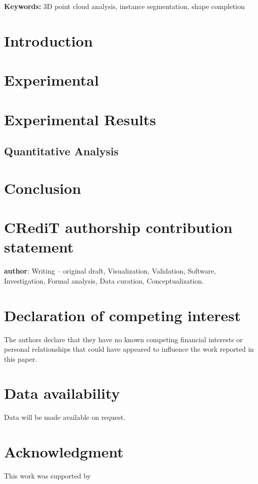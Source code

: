 \documentclass[12pt]{article}
\begin{document}
\textbf{Keywords:} 3D point cloud analysis, instance segmentation, shape completion

\doublespacing

\section{Introduction}

\citep{barbole_comparative_2023}


\section{Experimental}

\section{Experimental Results}

\subsection{Quantitative Analysis}

\section{Conclusion}


\section*{CRediT authorship contribution statement}
\textbf{author}: Writing – original draft, Visualization, Validation, Software, Investigation, Formal analysis, Data curation, Conceptualization. 

\section*{Declaration of competing interest}
The authors declare that they have no known competing financial interests or personal relationships that could have appeared to influence the work reported in this paper.

\section*{Data availability}
Data will be made available on request.

\section*{Acknowledgment}
This work was supported by


\end{document}
